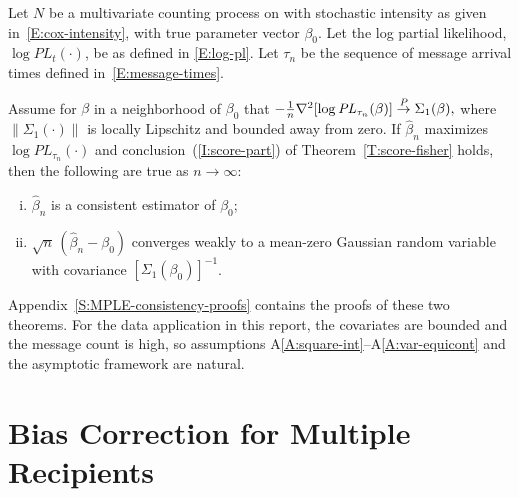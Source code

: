 \documentclass[aoas,preprint]{imsart}
\begin{document}
\begin{theorem}\label{T:consistency}
    Let $N$ be a multivariate counting process on with stochastic
    intensity as given in~\eqref{E:cox-intensity}, with true parameter
    vector $\beta_0$.  Let the log partial likelihood,
    $\log \mathit{PL}_t(\cdot)$, be as defined in \eqref{E:log-pl}.
    Let $\tau_n$ be the sequence of message arrival times defined
    in~\eqref{E:message-times}.
    
    Assume for $\beta$ in a
    neighborhood of $\beta_0$ that
    \(
        -\tfrac{1}{n} \nabla^2 [ \log \mathit{PL}_{\tau_n}(\beta)]
            \overset{\mathit{P}}{\to} \Sigma_1(\beta),
    \)
    where $\| \Sigma_1(\cdot) \|$ is locally Lipschitz and bounded
    away from zero.
    If $\hat \beta_n$ maximizes $\log \mathit{PL}_{\tau_n}(\cdot)$ and
    conclusion~(\ref{I:score-part}) of Theorem~\ref{T:score-fisher} holds,
    then the following are true as $n\to\infty$:
    \begin{enumerate}[(i)]
        \item $\hat \beta_n$ is a consistent estimator of $\beta_0$;
        \item $\sqrt{n} \, (\hat \beta_n - \beta_0)$ converges weakly
            to a mean-zero Gaussian random variable with covariance
            $[\Sigma_1(\beta_0)]^{-1}$.
    \end{enumerate}
\end{theorem}

Appendix~\ref{S:MPLE-consistency-proofs} contains the proofs of
these two theorems.  For the data application in this report,
the covariates are bounded and the message count is high, so 
assumptions A\ref{A:square-int}--A\ref{A:var-equicont} and
the asymptotic framework are natural.  




\section{Bias Correction for Multiple Recipients}\label{S:bias-correction}
\end{document}
